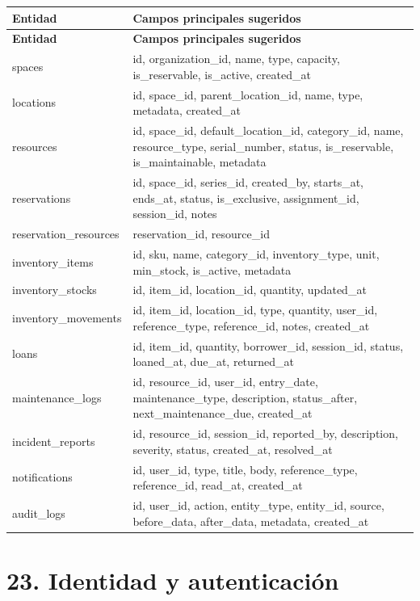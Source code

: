 \documentclass[12pt]{article}
\begin{document}
\footnotesize
\begin{longtable}{p{4cm} p{9cm}}
\toprule
\textbf{Entidad} & \textbf{Campos principales sugeridos} \\
\midrule
\endfirsthead
\toprule
\textbf{Entidad} & \textbf{Campos principales sugeridos} \\
\midrule
\endhead
spaces & id, organization\_id, name, type, capacity, is\_reservable, is\_active, created\_at \\
locations & id, space\_id, parent\_location\_id, name, type, metadata, created\_at \\
resources & id, space\_id, default\_location\_id, category\_id, name, resource\_type, serial\_number, status, is\_reservable, is\_maintainable, metadata \\
reservations & id, space\_id, series\_id, created\_by, starts\_at, ends\_at, status, is\_exclusive, assignment\_id, session\_id, notes \\
reservation\_resources & reservation\_id, resource\_id \\
inventory\_items & id, sku, name, category\_id, inventory\_type, unit, min\_stock, is\_active, metadata \\
inventory\_stocks & id, item\_id, location\_id, quantity, updated\_at \\
inventory\_movements & id, item\_id, location\_id, type, quantity, user\_id, reference\_type, reference\_id, notes, created\_at \\
loans & id, item\_id, quantity, borrower\_id, session\_id, status, loaned\_at, due\_at, returned\_at \\
maintenance\_logs & id, resource\_id, user\_id, entry\_date, maintenance\_type, description, status\_after, next\_maintenance\_due, created\_at \\
incident\_reports & id, resource\_id, session\_id, reported\_by, description, severity, status, created\_at, resolved\_at \\
notifications & id, user\_id, type, title, body, reference\_type, reference\_id, read\_at, created\_at \\
audit\_logs & id, user\_id, action, entity\_type, entity\_id, source, before\_data, after\_data, metadata, created\_at \\
\bottomrule
\end{longtable}
\normalsize

\section*{23. Identidad y autenticación}
\end{document}

